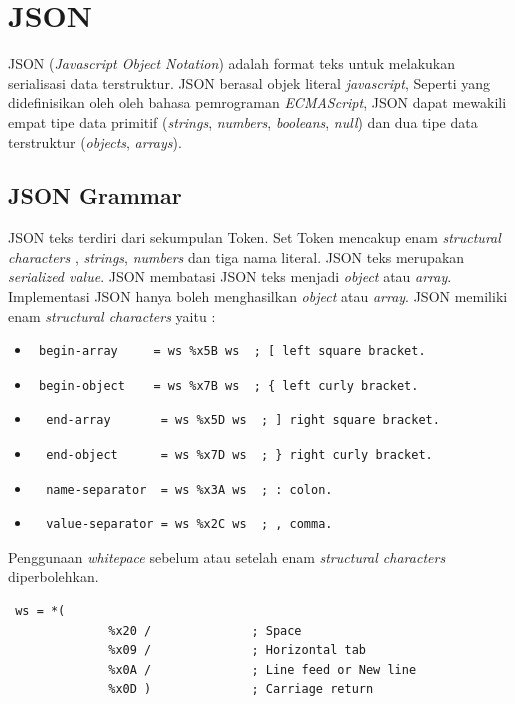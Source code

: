 \section{JSON}
\label{subsec:json}
JSON (\textit{Javascript Object Notation}) adalah format teks untuk melakukan serialisasi data terstruktur\cite{RFC:7159}. JSON berasal objek literal \textit{javascript}, Seperti yang didefinisikan oleh oleh bahasa pemrograman \textit{ECMAScript}, JSON dapat mewakili empat tipe data primitif (\textit{strings}, \textit{numbers}, \textit{booleans}, \textit{null}) dan dua tipe data terstruktur (\textit{objects}, \textit{arrays}).

\subsection{ JSON Grammar}
JSON teks terdiri dari sekumpulan Token. Set Token mencakup enam \textit{structural characters }, \textit{strings}, \textit{numbers} dan tiga nama literal. JSON teks merupakan \textit{serialized value}. JSON membatasi JSON teks menjadi \textit{object} atau \textit{array}. Implementasi JSON hanya boleh menghasilkan \textit{object} atau \textit{array}. JSON memiliki enam \textit{structural characters} yaitu :

\begin{itemize}
	\item \begin{verbatim} begin-array     = ws %x5B ws  ; [ left square bracket. 
	\end{verbatim}
	\item \begin{verbatim} begin-object    = ws %x7B ws  ; { left curly bracket. 
	\end{verbatim}
	\item \begin{verbatim}  end-array       = ws %x5D ws  ; ] right square bracket. 
	\end{verbatim}
	\item \begin{verbatim}  end-object      = ws %x7D ws  ; } right curly bracket. 
	\end{verbatim}
	\item \begin{verbatim}  name-separator  = ws %x3A ws  ; : colon.
	\end{verbatim}
	\item \begin{verbatim}  value-separator = ws %x2C ws  ; , comma.
	\end{verbatim}
\end{itemize}
Penggunaan \textit{whitepace} sebelum atau setelah enam \textit{structural characters} diperbolehkan.
\begin{verbatim} 
 ws = *(
              %x20 /              ; Space
              %x09 /              ; Horizontal tab
              %x0A /              ; Line feed or New line
              %x0D )              ; Carriage return
\end{verbatim}
    
